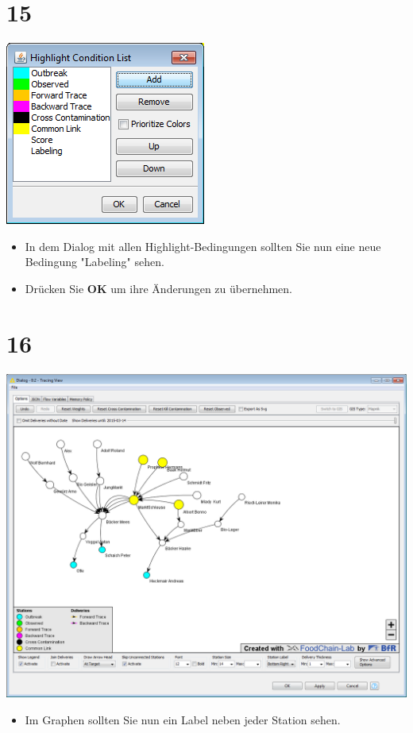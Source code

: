 \documentclass{beamer}
\begin{document}
\section{15}
\begin{frame}
	\begin{center}
  		\includegraphics[height=0.6\textheight]{15.png}
	\end{center}
	\begin{itemize}
		\item In dem Dialog mit allen Highlight-Bedingungen sollten Sie nun eine neue Bedingung "Labeling" sehen.
		\item Drücken Sie \textbf{OK} um ihre Änderungen zu übernehmen.
	\end{itemize}
\end{frame}

\section{16}
\begin{frame}
	\begin{center}
  		\includegraphics[height=0.6\textheight]{16.png}
	\end{center}
	\begin{itemize}
		\item Im Graphen sollten Sie nun ein Label neben jeder Station sehen.
	\end{itemize}
\end{frame}
\end{document}
